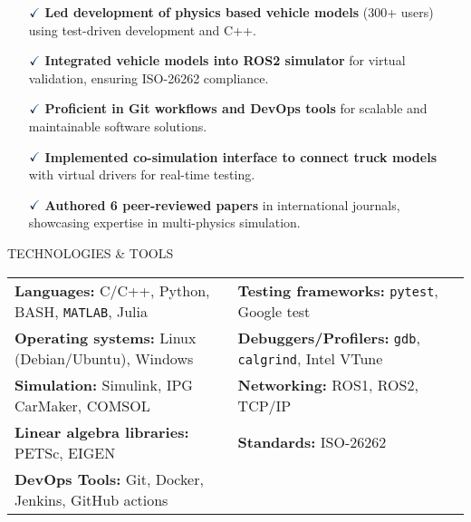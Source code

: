 \documentclass[a4paper,10pt]{article}
\begin{document}
\vspace{0.1cm}
\begin{itemize}
    \item[$\textcolor{highlightcolor}{\checkmark}$] \textcolor{highlightcolor}{\textbf{Led development of physics based vehicle models}} (300+ users) using test-driven development and C++.
    \item[$\textcolor{highlightcolor}{\checkmark}$] \textcolor{highlightcolor}{\textbf{Integrated vehicle models into ROS2 simulator}} for virtual validation, ensuring ISO-26262 compliance.
    \item[$\textcolor{highlightcolor}{\checkmark}$] \textcolor{highlightcolor}{\textbf{Proficient in Git workflows and DevOps tools}} for scalable and maintainable software solutions.
    \item[$\textcolor{highlightcolor}{\checkmark}$] \textcolor{highlightcolor}{\textbf{Implemented co-simulation interface to connect truck models}} with virtual drivers for real-time testing.
    \item[$\textcolor{highlightcolor}{\checkmark}$] \textcolor{highlightcolor}{\textbf{Authored 6 peer-reviewed papers}} in international journals, showcasing expertise in multi-physics simulation.
\end{itemize}

\noindent{\rule{\linewidth}{1.4pt}}
TECHNOLOGIES \& TOOLS

\vspace{-0.1cm}
\noindent{\rule{\linewidth}{0.01cm}}

\vspace{-0.4cm}
\noindent
\begin{center}
    \begin{tabular}{ @{\hskip 0pt}m{} m{} }
        \textcolor{highlightcolor}{\textbf{Languages:}} C/C++, Python, BASH, {\verb|MATLAB|}, Julia & \textcolor{highlightcolor}{\textbf{Testing frameworks:}} \verb|pytest|, Google test \\ 
        \textcolor{highlightcolor}{\textbf{Operating systems:}} Linux (Debian/Ubuntu), Windows & \textcolor{highlightcolor}{\textbf{Debuggers/Profilers:}} \verb|gdb|, \verb|calgrind|, Intel VTune \\
        \textcolor{highlightcolor}{\textbf{Simulation:}} Simulink, IPG CarMaker, COMSOL & \textcolor{highlightcolor}{\textbf{Networking:}} ROS1, ROS2, TCP/IP \\
        \textcolor{highlightcolor}{\textbf{Linear algebra libraries:}} PETSc, EIGEN & \textcolor{highlightcolor}{\textbf{Standards:}} ISO-26262 \\
        \textcolor{highlightcolor}{\textbf{DevOps Tools:}} Git, Docker, Jenkins, GitHub actions &  \\
    \end{tabular}
\end{center}
\end{document}
